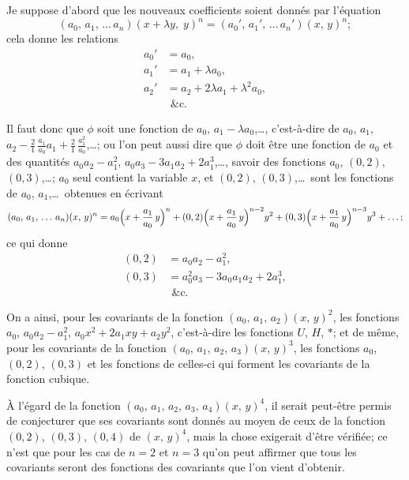 \documentclass[11pt,a4paper]{article}
\theoremstyle{definition}
\begin{document}
Je suppose d'abord que les nouveaux coefficients soient donn\'es par
l'\'equation
\[
(a_0,\, a_1,\, \ldots\, a_n)(x + \lambda y,\; y)^n
= (a_0',\, a_1',\, \ldots\, a_n')(x,\, y)^n;
\]
cela donne les relations
\begin{align*}
a_0' &= a_0, \\
a_1' &= a_1 + \lambda a_0, \\
a_2' &= a_2 + 2\lambda a_1 + \lambda^2 a_0, \\
& \ \,\text{\&c.}
\end{align*}

Il faut donc que $\phi$ soit une fonction de $a_0$, $a_1 - \lambda a_0$,\ldots,
c'est-\`a-dire de $a_0$, $a_1$, $a_2 - \tfrac{2}{1}\,\tfrac{a_1}{a_0}a_1 + \tfrac{2}{1}\,\tfrac{a_1^2}{a_0}$,\ldots;
ou l'on peut aussi dire que $\phi$ doit \^etre une fonction de $a_0$ et des
quantit\'es $a_0a_2 - a_1^2$, $a_0a_3 - 3a_1a_2 + 2a_1^3$,\ldots, savoir des
fonctions $a_0$, $(0,2)$, $(0,3)$,\ldots; $a_0$ seul contient la variable $x$,
et $(0,2)$, $(0,3)$,\ldots\ sont les fonctions de $a_0$, $a_1$,\ldots\ obtenues
en \'ecrivant
\[
(a_0,\, a_1,\, \ldots\, a_n)(x,\, y)^n
= a_0\Bigl(x + \frac{a_1}{a_0}\,y\Bigr)^n
+ (0,2)\Bigl(x + \frac{a_1}{a_0}\,y\Bigr)^{n-2} y^2
+ (0,3)\Bigl(x + \frac{a_1}{a_0}\,y\Bigr)^{n-3} y^3 + \ldots;
\]
ce qui donne
\begin{align*}
(0,2) &= a_0a_2 - a_1^2, \\
(0,3) &= a_0^2a_3 - 3a_0a_1a_2 + 2a_1^3, \\
& \ \,\text{\&c.}
\end{align*}

\medskip

On a ainsi, pour les covariants de la fonction $(a_0,\, a_1,\, a_2)(x,\, y)^2$,
les fonctions $a_0$, $a_0a_2 - a_1^2$, $a_0 x^2 + 2a_1 xy + a_2 y^2$, c'est-\`a-dire
les fonctions $U$, $H$, $*$; et de m\^eme, pour les covariants de la fonction
$(a_0,\, a_1,\, a_2,\, a_3)(x,\, y)^3$, les fonctions $a_0$, $(0,2)$, $(0,3)$
et les fonctions de celles-ci qui forment les covariants de la fonction cubique.

\medskip

\`A l'\'egard de la fonction $(a_0,\, a_1,\, a_2,\, a_3,\, a_4)(x,\, y)^4$, il
serait peut-\^etre permis de conjecturer que ses covariants sont donn\'es au
moyen de ceux de la fonction $(0,2)$, $(0,3)$, $(0,4)$ de $(x,\, y)^4$, mais
la chose exigerait d'\^etre v\'erifi\'ee; ce n'est que pour les cas de
$n=2$ et $n=3$ qu'on peut affirmer que tous les covariants seront des
fonctions des covariants que l'on vient d'obtenir.
\end{document}
